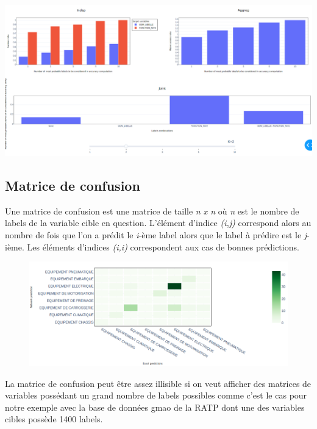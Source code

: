 \begin{center}
\includegraphics[width=1\textwidth]{figures/visu_success.png}
\label{fig11}
\end{center}

\subsection{Matrice de confusion}

Une matrice de confusion est une matrice de taille \textit{n x n} où \textit{n} est le nombre de
labels de la variable cible en question. L'élément d’indice \textit{(i,j)} correspond alors au
nombre de fois que l’on a prédit le \textit{i}-ème label alors que le label à prédire est le
\textit{j}-ième. Les éléments d’indices \textit{(i,i)} correspondent aux cas de bonnes prédictions.

\begin{figure}
\includegraphics[width=1\textwidth]{figures/confusion_matrix.png}
\label{fig12}
\end{figure}

La matrice de confusion peut être assez illisible si on veut afficher des matrices de variables possédant un grand nombre de labels possibles comme c’est le cas pour notre exemple avec la base de données gmao de la RATP dont une des variables cibles possède 1400 labels.

